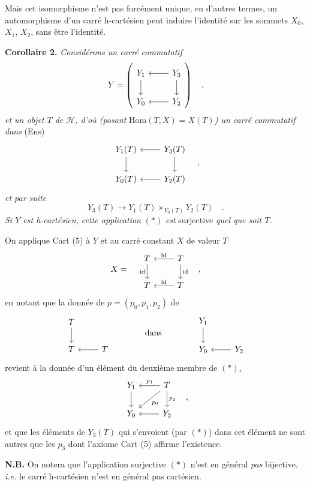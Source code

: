\documentclass[11pt]{article}
\newcommand{\printedpage}[1]{\marginpar{\footnotesize p.~#1}}
\newcommand{\msp}[1]{\marginpar{\footnotesize [#1]}}
\begin{document}
Mais cet isomorphisme n'est pas forcément unique, en d'autres termes, un automorphisme d'un carré h-cartésien peut induire l'identité sur les sommets $X_0$, $X_1$, $X_2$, sans être l'identité.

\printedpage{5}

\msp{page 6}
\textbf{Corollaire 2.} \textit{Considérons un carré commutatif}
\[
Y = \left(\begin{tikzcd}
Y_1 \ar[d] & Y_3 \ar[l] \ar[d] \\
Y_0 & Y_2 \ar[l]
\end{tikzcd}\right) \quad ,
\]
\textit{et un objet $T$ de $\mathcal{H}$, d'où (posant} $\mathrm{Hom}(T,X) = X(T)$\textit{) un carré commutatif dans} (Ens)
\[
\begin{tikzcd}
Y_1(T) \ar[d] & Y_3(T) \ar[l] \ar[d] \\
Y_0(T) & Y_2(T) \ar[l]
\end{tikzcd} \quad ,
\]
\textit{et par suite}
\[
Y_3(T) \longrightarrow Y_1(T) \times_{Y_0(T)} Y_2(T) \quad . \tag*{$(*)$}
\]
\textit{Si $Y$ est h-cartésien, cette application} $(*)$ \textit{est} surjective \textit{quel que soit $T$.}

On applique Cart (5) à $Y$ et au carré constant $X$ de valeur $T$
\[
X = \quad
\begin{tikzcd}
T \ar[d, "\mathrm{id}"'] & T \ar[l, "\mathrm{id}"'] \ar[d, "\mathrm{id}"] \\
T & T \ar[l, "\mathrm{id}"']
\end{tikzcd} \quad ,
\]
en notant que la donnée de $p = (p_0, p_1, p_2)$ de
\[
\begin{tikzcd}
T \ar[d] & \\
T & T \ar[l]
\end{tikzcd}
\qquad\qquad \text{dans} \qquad\qquad
\begin{tikzcd}
Y_1 \ar[d] & \\
Y_0 & Y_2 \ar[l]
\end{tikzcd}
\]
revient à la donnée d'un élément du deuxième membre de $(*)$,
\[
\begin{tikzcd}
Y_1 \ar[d] & T \ar[l, "p_1"'] \ar[dl, "p_0"] \ar[d, "p_2"] \\
Y_0 & Y_2 \ar[l]
\end{tikzcd} \quad ,
\]
et que les éléments de $Y_3(T)$ qui s'envoient (par $(*)$) dans cet élément ne sont autres que les $p_3$ dont l'axiome Cart (5) affirme l'existence.

\textbf{N.B.} On notera que l'application surjective $(*)$ n'est en général \textit{pas} bijective, \textit{i.e.} le carré h-cartésien n'est en général pas cartésien.
\end{document}

